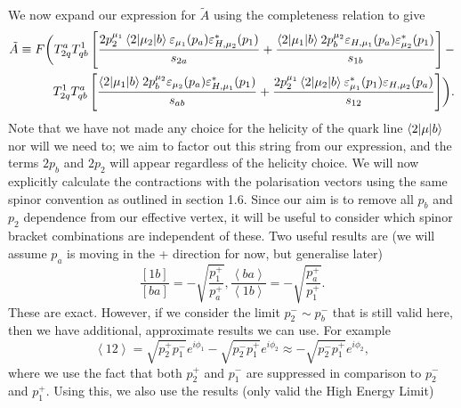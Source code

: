 We now expand our expression for $\tilde{A}$ using the completeness relation to give
\begin{equation}
\begin{split}
\tilde{A} \equiv F \biggl( T^a_{2q}T^1_{qb} \left[ \frac{2 p_2^{\mu_1} \mathinner{\langle2\vert\mu_2\vert b\rangle}_{} \varepsilon_{\mu_1} (p_a) \varepsilon_{H,\mu_2}^*(p_1)}{s_{2a}} + \frac{\mathinner{\langle2\vert\mu_1\vert b\rangle}_{} 2 p_b^{\mu_2} \varepsilon_{H,\mu_1}(p_a)\varepsilon^*_{\mu_2}(p_1)}{s_{1b}} \right]
 - \\
T^1_{2q}T^a_{qb} \left[ \frac{\mathinner{\langle2\vert\mu_1\vert b\rangle}_{}2p_b^{\mu_2}\varepsilon_{\mu_2}(p_a)\varepsilon^*_{H,\mu_1}(p_1)}{s_{ab}} + \frac{2p_2^{\mu_1}\mathinner{\langle2\vert\mu_2\vert b\rangle}_{} \varepsilon_{\mu_1}^*(p_1) \varepsilon_{H,\mu_2}(p_a)}{s_{12}} \right] \biggr).
\end{split}
\end{equation}
Note that we have not made any choice for the helicity of the quark line $\mathinner{\langle2\vert\mu\vert b\rangle}_{}$ nor will we need to; we aim to factor out this string from our expression, and the terms $2p_b$ and $2p_2$ will appear regardless of the helicity choice. We will now explicitly calculate the contractions with the polarisation vectors using the same spinor convention as outlined in section 1.6. Since our aim is to remove all $p_b$ and $p_2$ dependence from our effective vertex, it will be useful to consider which spinor bracket combinations are independent of these. Two useful results are (we will assume $p_a$ is moving in the + direction for now, but generalise later) %
\begin{subequations}
\begin{equation}
\frac{[1b]}{[ba]} = -\sqrt{\frac{p_1^+}{p_a^+}},
\end{equation}
\begin{equation}
\frac{\left<ba\right>}{\left<1b\right>} = -\sqrt{\frac{p_a^+}{p_1^+}}.
\end{equation}
\end{subequations}
These are exact. However, if we consider the limit $p_2^- \sim p_b^-$ that is still valid here, then we have additional, approximate results we can use. For example
\begin{equation}
\left<1 2 \right> = \sqrt{p_2^+ p_1^-} e^{i \phi_1} - \sqrt{p_2^- p_1^+}e^{i \phi_2} \approx  - \sqrt{p_2^- p_1^+}e^{i \phi_2},
\end{equation}
where we use the fact that both $p_2^+$ and $p_1^-$ are suppressed in comparison to $p_2^-$ and $p_1^+$. Using this, we also use the results (only valid the High Energy Limit)
